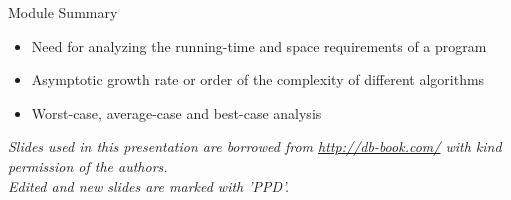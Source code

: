 \documentclass[aspectratio=169, xcolor=dvipsnames]{beamer}
\begin{document}
\begin{frame}{Module Summary}
    \begin{block}{}
        \begin{itemize}[<+->]
            \item Need for analyzing the running-time and space requirements of a program
            \item Asymptotic growth rate or order of the complexity of different algorithms
            \item Worst-case, average-case and best-case analysis
        \end{itemize}
    \end{block}
    \vspace{2em}
    \begin{center}
    \small \textit{Slides used in this presentation are borrowed from \url{http://db-book.com/} with kind permission of the authors.} \\
    \small \textit{Edited and new slides are marked with 'PPD'.}
    \end{center}
\end{frame}
\end{document}
